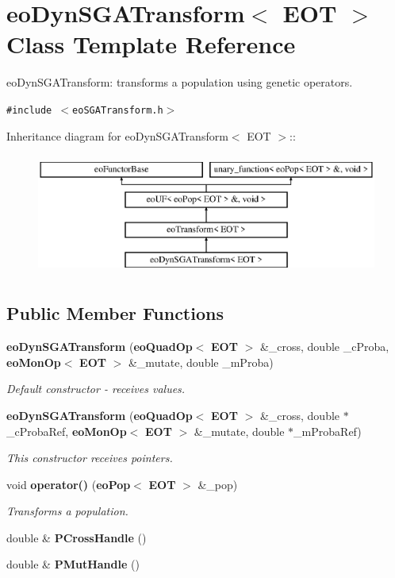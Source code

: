 \section{eo\-Dyn\-SGATransform$<$ EOT $>$ Class Template Reference}
\label{classeo_dyn_s_g_a_transform}
eo\-Dyn\-SGATransform: transforms a population using genetic operators.  


{\tt \#include $<$eo\-SGATransform.h$>$}

Inheritance diagram for eo\-Dyn\-SGATransform$<$ EOT $>$::\begin{figure}[H]
\begin{center}
\leavevmode
\includegraphics[height=4cm]{classeo_dyn_s_g_a_transform}
\end{center}
\end{figure}
\subsection*{Public Member Functions}
\begin{CompactItemize}
\item 
{\bf eo\-Dyn\-SGATransform} ({\bf eo\-Quad\-Op}$<$ {\bf EOT} $>$ \&\_\-cross, double \_\-c\-Proba, {\bf eo\-Mon\-Op}$<$ {\bf EOT} $>$ \&\_\-mutate, double \_\-m\-Proba)\label{classeo_dyn_s_g_a_transform_a0}

\begin{CompactList}\small\item\em Default constructor - receives values. \item\end{CompactList}\item 
{\bf eo\-Dyn\-SGATransform} ({\bf eo\-Quad\-Op}$<$ {\bf EOT} $>$ \&\_\-cross, double $\ast$\_\-c\-Proba\-Ref, {\bf eo\-Mon\-Op}$<$ {\bf EOT} $>$ \&\_\-mutate, double $\ast$\_\-m\-Proba\-Ref)\label{classeo_dyn_s_g_a_transform_a1}

\begin{CompactList}\small\item\em This constructor receives pointers. \item\end{CompactList}\item 
void {\bf operator()} ({\bf eo\-Pop}$<$ {\bf EOT} $>$ \&\_\-pop)
\begin{CompactList}\small\item\em Transforms a population. \item\end{CompactList}\item 
double \& {\bf PCross\-Handle} ()\label{classeo_dyn_s_g_a_transform_a3}

\item 
double \& {\bf PMut\-Handle} ()\label{classeo_dyn_s_g_a_transform_a4}

\end{CompactItemize}

